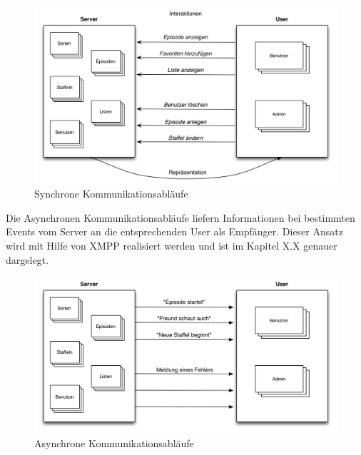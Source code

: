 \begin{figure}[H]
\includegraphics[width=1\textwidth]{../images/kommunikationsablaeufe.png}
\caption{Synchrone Kommunikationsabläufe}
\label{kommunikationsablaeufe}
\end{figure}

Die Asynchronen Kommunikationsabläufe liefern Informationen bei bestimmten Events vom Server an die entsprechenden User als Empfänger. Dieser Ansatz wird mit Hilfe von XMPP realisiert werden und ist im Kapitel X.X genauer dargelegt.

\begin{figure}[H]
\includegraphics[width=1\textwidth]{../images/kommunikationsablaeufeAsynchron.png}
\caption{Asynchrone Kommunikationsabläufe}
\label{kommunikationsablaeufeAsynchron}
\end{figure}
